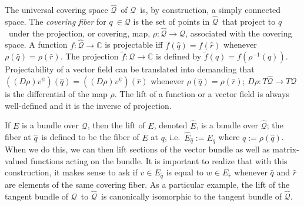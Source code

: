 \documentclass[11pt]{article}
\theoremstyle{remark}
\begin{document}
The universal covering space \ensuremath{\widehat{\ensuremath{\mathcal{Q}}}}\  of \ensuremath{\mathcal{Q}}\ is, by
construction,   a
simply connected space. The
\emph{covering fiber} for $\ensuremath{q}\ \in \ensuremath{\mathcal{Q}}$ is the set of points in \ensuremath{\widehat{\ensuremath{\mathcal{Q}}}}\ that
project to \ensuremath{q}\ under the projection, or covering,  map, 
$\ensuremath{\ensuremath{\rho}}: \ensuremath{\widehat{\ensuremath{\mathcal{Q}}}} \to \ensuremath{\mathcal{Q}}$,  associated with 
the covering 
space. A function $f: \ensuremath{\widehat{\ensuremath{\mathcal{Q}}}} \to \ensuremath{\mathbb{C}}$ is projectable iff  $f(\ensuremath{\hat{q}}) =
f(\hat{r})$ whenever $\ensuremath{\ensuremath{\rho}}(\ensuremath{\hat{q}}) = \ensuremath{\ensuremath{\rho}}(\hat{r})$. 
The projection  $\tilde{f} :
\ensuremath{\mathcal{Q}} \to \ensuremath{\mathbb{C}}$ is defined by $\tilde{f}(\ensuremath{q}) = f(\ensuremath{\ensuremath{\rho}}^{-1}
(\ensuremath{q}))$.
Projectability of a vector field 
can be translated into demanding that  
$((D\ensuremath{\ensuremath{\rho}}) v^{\ensuremath{\psi}}) (\ensuremath{\hat{q}}) = ((D\ensuremath{\ensuremath{\rho}}) v^{\ensuremath{\psi}}) (\hat{r})$ whenever
$\ensuremath{\ensuremath{\rho}}(\ensuremath{\hat{q}}) = \ensuremath{\ensuremath{\rho}}(\hat r )$; $D\ensuremath{\ensuremath{\rho}}: T\ensuremath{\widehat{\ensuremath{\mathcal{Q}}}} \to T\ensuremath{\mathcal{Q}}$ is
the differential of the 
map \ensuremath{\ensuremath{\rho}}. The lift of a function or a vector field 
is always well-defined and it is the
inverse of projection. 

If $E$ is a bundle over \ensuremath{\mathcal{Q}}, then the lift of $E$, denoted
$\ensuremath{\widehat{E}}$, is a bundle over \ensuremath{\widehat{\ensuremath{\mathcal{Q}}}}; the fiber at \ensuremath{\hat{q}}\ is defined 
to be the fiber of $E$ at $\ensuremath{q}$, i.e.\ 
$\ensuremath{\widehat{E}}_{\ensuremath{\hat{q}}} \ensuremath{:=} E_{\ensuremath{q}}$ where $\ensuremath{q} \ensuremath{:=} \ensuremath{\ensuremath{\rho}}(\ensuremath{\hat{q}})$.
 When we do this, we can then lift sections of the vector bundle as
well as matrix-valued functions acting on the bundle. It is important
to realize that with this construction, it makes sense to ask if $v
\in E_{\ensuremath{\hat{q}}}$ is equal to $w \in E_{\hat{r}}$ whenever $\ensuremath{\hat{q}}$ and
$\hat{r}$ are elements of the same covering fiber.
As a particular example, the lift of the tangent
bundle of \ensuremath{\mathcal{Q}}\ to \ensuremath{\widehat{\ensuremath{\mathcal{Q}}}}\ is canonically isomorphic to 
the tangent bundle of \ensuremath{\widehat{\ensuremath{\mathcal{Q}}}}. 
\end{document}
